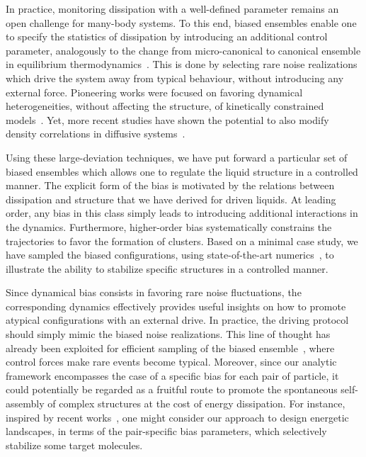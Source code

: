 \documentclass[superscriptaddress, twocolumn, prx, longbibliography, nofootinbib]{revtex4-1}
\begin{document}
In practice, monitoring dissipation with a well-defined parameter remains an open challenge for many-body systems. To this end, biased ensembles enable one to specify the statistics of dissipation by introducing an additional control parameter, analogously to the change from micro-canonical to canonical ensemble in equilibrium thermodynamics~\cite{Chetrite2013, Jack2010}. This is done by selecting rare noise realizations which drive the system away from typical behaviour, without introducing any external force. Pioneering works were focused on favoring dynamical heterogeneities, without affecting the structure, of kinetically constrained models~\cite{garrahan2007, Hedges2009, Pitard2011, Speck2012, Bodineau2012a}. Yet, more recent studies have shown the potential to also modify density correlations in diffusive systems~\cite{Jack2014, Cagnetta2017, nemoto2018optimizing}.


Using these large-deviation techniques, we have put forward a particular set of biased ensembles which allows one to regulate the liquid structure in a controlled manner. The explicit form of the bias is motivated by the relations between dissipation and structure that we have derived for driven liquids. At leading order, any bias in this class simply leads to introducing additional interactions in the dynamics. Furthermore, higher-order bias systematically constrains the trajectories to favor the formation of clusters. Based on a minimal case study, we have sampled the biased configurations, using state-of-the-art numerics~\cite{Giadina2006, tailleur2007probing, Hurtado2009, Nemoto2016, Ray2018, Klymko2018, Brewer2018}, to illustrate the ability to stabilize specific structures in a controlled manner. 


Since dynamical bias consists in favoring rare noise fluctuations, the corresponding dynamics effectively provides useful insights on how to promote atypical configurations with an external drive. In practice, the driving protocol should simply mimic the biased noise realizations. This line of thought has already been exploited for efficient sampling of the biased ensemble~\cite{Nemoto2016, Jack2017, Jack2018}, where control forces make rare events become typical. Moreover, since our analytic framework encompasses the case of a specific bias for each pair of particle, it could potentially be regarded as a fruitful route to promote the spontaneous self-assembly of complex structures at the cost of energy dissipation. For instance, inspired by recent works~\cite{Murugan2015, Murugan2017b}, one might consider our approach to design energetic landscapes, in terms of the pair-specific bias parameters, which selectively stabilize some target molecules. 
\end{document}

